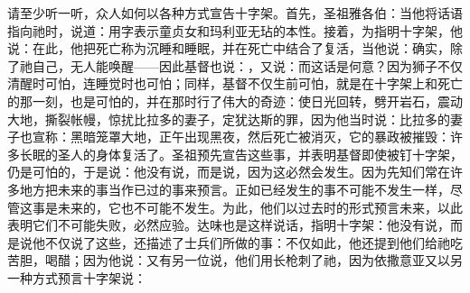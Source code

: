 请至少听一听，众人如何以各种方式宣告十字架。首先，圣祖雅各伯：当他将话语指向祂时，说道：用字表示童贞女和玛利亚无玷的本性。接着，为指明十字架，他说：在此，他把死亡称为沉睡和睡眠，并在死亡中结合了复活，当他说：确实，除了祂自己，无人能唤醒——因此基督也说：，又说：而这话是何意？因为狮子不仅清醒时可怕，连睡觉时也可怕；同样，基督不仅生前可怕，就是在十字架上和死亡的那一刻，也是可怕的，并在那时行了伟大的奇迹：使日光回转，劈开岩石，震动大地，撕裂帐幔，惊扰比拉多的妻子，定犹达斯的罪，因为他当时说：比拉多的妻子也宣称：黑暗笼罩大地，正午出现黑夜，然后死亡被消灭，它的暴政被摧毁：许多长眠的圣人的身体复活了。圣祖预先宣告这些事，并表明基督即使被钉十字架，仍是可怕的，于是说：他没有说，而是说，因为这必然会发生。因为先知们常在许多地方把未来的事当作已过的事来预言。正如已经发生的事不可能不发生一样，尽管这事是未来的，它也不可能不发生。为此，他们以过去时的形式预言未来，以此表明它们不可能失败，必然应验。达味也是这样说话，指明十字架：他没有说，而是说他不仅说了这些，还描述了士兵们所做的事：不仅如此，他还提到他们给祂吃苦胆，喝醋；因为他说：又有另一位说，他们用长枪刺了祂，因为依撒意亚又以另一种方式预言十字架说：\par

